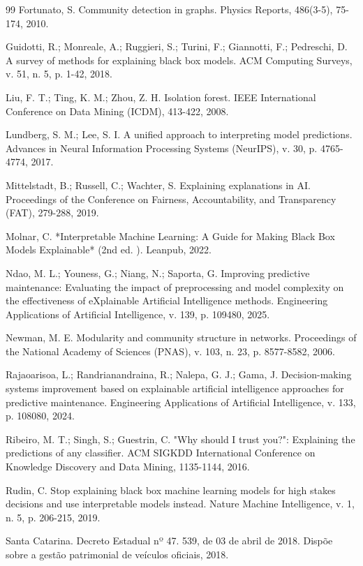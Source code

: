 \documentclass[12pt,a4paper]{article}
\begin{document}
\begin{thebibliography}{99}
 Fortunato, S. Community detection in graphs. Physics Reports, 486(3-5), 75-174, 2010.

 Guidotti, R.; Monreale, A.; Ruggieri, S.; Turini, F.; Giannotti, F.; Pedreschi, D. A survey of methods for explaining black box models. ACM Computing Surveys, v. 51, n. 5, p. 1-42, 2018.

 Liu, F. T.; Ting, K. M.; Zhou, Z. H. Isolation forest. IEEE International Conference on Data Mining (ICDM), 413-422, 2008.

 Lundberg, S. M.; Lee, S. I. A unified approach to interpreting model predictions. Advances in Neural Information Processing Systems (NeurIPS), v. 30, p. 4765-4774, 2017.

 Mittelstadt, B.; Russell, C.; Wachter, S. Explaining explanations in AI. Proceedings of the Conference on Fairness, Accountability, and Transparency (FAT), 279-288, 2019.

 Molnar, C. *Interpretable Machine Learning: A Guide for Making Black Box Models Explainable* (2nd ed. ). Leanpub, 2022.

 Ndao, M. L.; Youness, G.; Niang, N.; Saporta, G. Improving predictive maintenance: Evaluating the impact of preprocessing and model complexity on the effectiveness of eXplainable Artificial Intelligence methods. Engineering Applications of Artificial Intelligence, v. 139, p. 109480, 2025.

 Newman, M. E. Modularity and community structure in networks. Proceedings of the National Academy of Sciences (PNAS), v. 103, n. 23, p. 8577-8582, 2006.

 Rajaoarisoa, L.; Randrianandraina, R.; Nalepa, G. J.; Gama, J. Decision-making systems improvement based on explainable artificial intelligence approaches for predictive maintenance. Engineering Applications of Artificial Intelligence, v. 133, p. 108080, 2024.

 Ribeiro, M. T.; Singh, S.; Guestrin, C. "Why should I trust you?": Explaining the predictions of any classifier. ACM SIGKDD International Conference on Knowledge Discovery and Data Mining, 1135-1144, 2016.

 Rudin, C. Stop explaining black box machine learning models for high stakes decisions and use interpretable models instead. Nature Machine Intelligence, v. 1, n. 5, p. 206-215, 2019.

 Santa Catarina. Decreto Estadual nº 47. 539, de 03 de abril de 2018. Dispõe sobre a gestão patrimonial de veículos oficiais, 2018.


\end{thebibliography}
\end{document}

